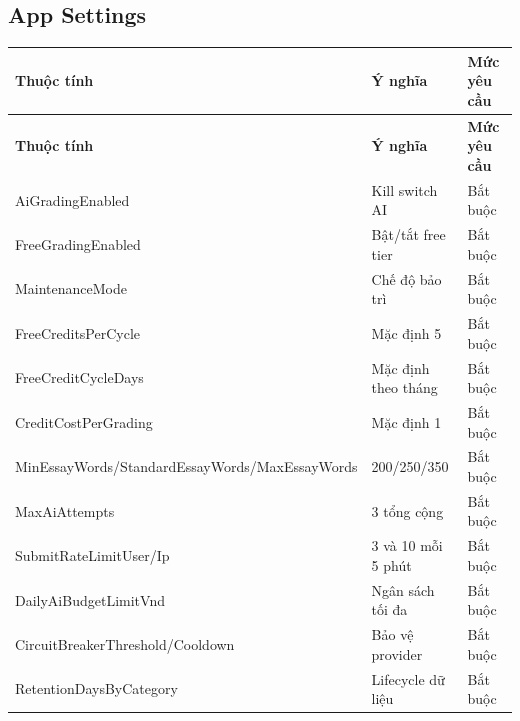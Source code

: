 \documentclass[11pt,a4paper]{article}
\begin{document}
\subsection{App Settings}
\small
\setlength{\tabcolsep}{4pt}
\renewcommand{\arraystretch}{1.18}
\begin{longtable}{|P{0.28\textwidth}|P{0.45\textwidth}|P{0.19\textwidth}|}
\hline
\textbf{Thuộc tính} & \textbf{Ý nghĩa} & \textbf{Mức yêu cầu} \\ \hline
\endfirsthead
\hline
\textbf{Thuộc tính} & \textbf{Ý nghĩa} & \textbf{Mức yêu cầu} \\ \hline
\endhead
AiGradingEnabled & Kill switch AI & Bắt buộc \\ \hline
FreeGradingEnabled & Bật/\allowbreak{}tắt free tier & Bắt buộc \\ \hline
MaintenanceMode & Chế độ bảo trì & Bắt buộc \\ \hline
FreeCreditsPerCycle & Mặc định 5 & Bắt buộc \\ \hline
FreeCreditCycleDays & Mặc định theo tháng & Bắt buộc \\ \hline
CreditCostPerGrading & Mặc định 1 & Bắt buộc \\ \hline
MinEssayWords/\allowbreak{}StandardEssayWords/\allowbreak{}MaxEssayWords & 200/\allowbreak{}250/\allowbreak{}350 & Bắt buộc \\ \hline
MaxAiAttempts & 3 tổng cộng & Bắt buộc \\ \hline
SubmitRateLimitUser/\allowbreak{}Ip & 3 và 10 mỗi 5 phút & Bắt buộc \\ \hline
DailyAiBudgetLimitVnd & Ngân sách tối đa & Bắt buộc \\ \hline
CircuitBreakerThreshold/\allowbreak{}Cooldown & Bảo vệ provider & Bắt buộc \\ \hline
RetentionDaysByCategory & Lifecycle dữ liệu & Bắt buộc \\ \hline
\end{longtable}
\normalsize
\end{document}
